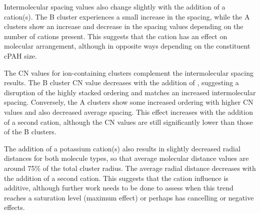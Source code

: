 Intermolecular spacing values also change slightly with the addition of a cation(s). The B cluster experiences a small increase in the spacing, while the A clusters show an increase and decrease in the spacing values depending on the number of cations present. This suggests that the cation has an effect on molecular arrangement, although in opposite ways depending on the constituent cPAH size. %

The CN values for ion-containing clusters complement the intermolecular spacing results. The B cluster CN value decreases with the addition of , suggesting a disruption of the highly stacked ordering and matches an increased intermolecular spacing. Conversely, the A clusters show some increased ordering with higher CN values and also decreased average spacing. This effect increases with the addition of a second cation, although the CN values are still significantly lower than those of the B clusters.

The addition of a potassium cation(s) also results in slightly %
decreased radial distances for both molecule types, so that average molecular distance values are around 75\% of the total cluster radius. The average radial distance decreases with the addition of a second cation. %
This suggests that the cation influence is additive, although further work needs to be done to assess when this trend reaches a saturation level (maximum effect) or perhaps has cancelling or negative effects. 



